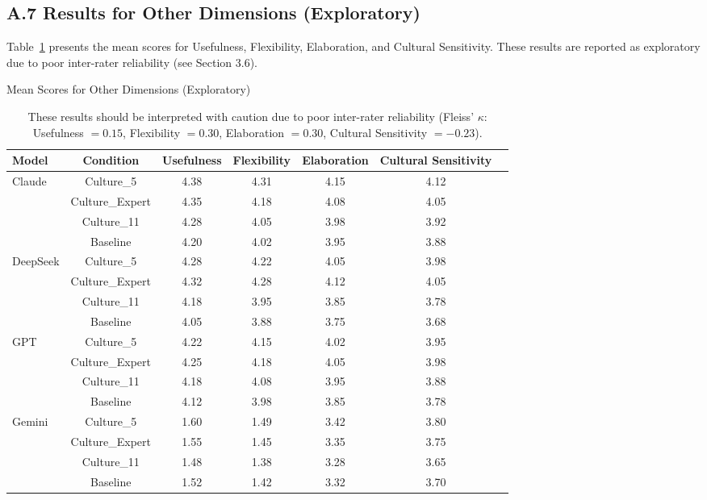\documentclass{article}
\begin{document}
\newpage
\subsection*{A.7 Results for Other Dimensions (Exploratory)}

Table~\ref{tab:other_dimensions} presents the mean scores for Usefulness, Flexibility, Elaboration, and Cultural Sensitivity. These results are reported as exploratory due to poor inter-rater reliability (see Section 3.6).

\begin{table}[H]
\centering
\caption{Mean Scores for Other Dimensions (Exploratory)}
\label{tab:other_dimensions}
\begin{tabular}{lcccccc}
\toprule
Model & Condition & Usefulness & Flexibility & Elaboration & Cultural Sensitivity \\
\midrule
\multirow{4}{*}{Claude} & Culture\_5 & 4.38 & 4.31 & 4.15 & 4.12 \\
 & Culture\_Expert & 4.35 & 4.18 & 4.08 & 4.05 \\
 & Culture\_11 & 4.28 & 4.05 & 3.98 & 3.92 \\
 & Baseline & 4.20 & 4.02 & 3.95 & 3.88 \\
\midrule
\multirow{4}{*}{DeepSeek} & Culture\_5 & 4.28 & 4.22 & 4.05 & 3.98 \\
 & Culture\_Expert & 4.32 & 4.28 & 4.12 & 4.05 \\
 & Culture\_11 & 4.18 & 3.95 & 3.85 & 3.78 \\
 & Baseline & 4.05 & 3.88 & 3.75 & 3.68 \\
\midrule
\multirow{4}{*}{GPT} & Culture\_5 & 4.22 & 4.15 & 4.02 & 3.95 \\
 & Culture\_Expert & 4.25 & 4.18 & 4.05 & 3.98 \\
 & Culture\_11 & 4.18 & 4.08 & 3.95 & 3.88 \\
 & Baseline & 4.12 & 3.98 & 3.85 & 3.78 \\
\midrule
\multirow{4}{*}{Gemini} & Culture\_5 & 1.60 & 1.49 & 3.42 & 3.80 \\
 & Culture\_Expert & 1.55 & 1.45 & 3.35 & 3.75 \\
 & Culture\_11 & 1.48 & 1.38 & 3.28 & 3.65 \\
 & Baseline & 1.52 & 1.42 & 3.32 & 3.70 \\
\bottomrule
\end{tabular}
\caption*{\footnotesize These results should be interpreted with caution due to poor inter-rater reliability (Fleiss' $\kappa$: Usefulness $= 0.15$, Flexibility $= 0.30$, Elaboration $= 0.30$, Cultural Sensitivity $= -0.23$).}
\end{table}
\end{document}
